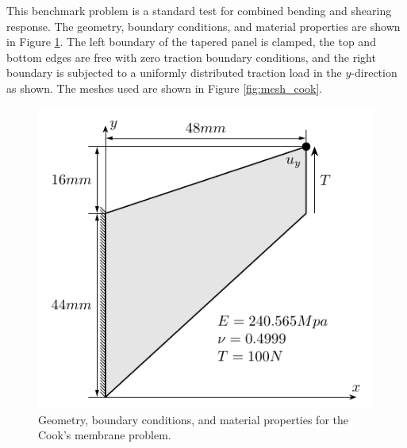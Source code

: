 \documentclass{article}
\begin{document}
This benchmark problem is a standard test for combined bending and shearing response. The geometry, boundary conditions, and material properties are shown in Figure \ref{fig:Cook's}. The left boundary of the tapered panel is clamped, the top and bottom edges are free with zero traction boundary conditions, and the right boundary is subjected to a uniformly distributed traction load in the $y$-direction as shown. The meshes used are shown in Figure \ref{fig:mesh_cook}.
\begin{figure}[htb!]
	\centering
	\includegraphics[width=0.5\linewidth]{Cook_s}
	\caption{Geometry, boundary conditions, and material properties for the Cook's membrane problem.}
	\label{fig:Cook's}
\end{figure}
\end{document}
